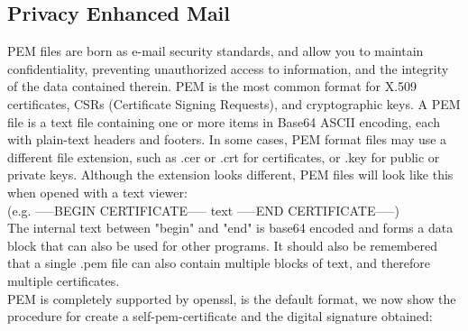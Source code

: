\documentclass{article}
\begin{document}
\subsection{Privacy Enhanced Mail}
PEM files are born as e-mail security standards, and allow you to maintain confidentiality, preventing unauthorized access to information, and the integrity of the data contained therein. PEM is the most common format for X.509 certificates, CSRs (Certificate Signing Requests), and cryptographic keys. A PEM file is a text file containing one or more items in Base64 ASCII encoding, each with plain-text headers and footers. In some cases, PEM format files may use a different file extension, such as .cer or .crt for certificates, or .key for public or private keys. Although the extension looks different, PEM files will look like this when opened with a text viewer:\\
(e.g. -----BEGIN CERTIFICATE----- text -----END CERTIFICATE-----)\\The internal text between "begin" and "end" is base64 encoded and forms a data block that can also be used for other programs. It should also be remembered that a single .pem file can also contain multiple blocks of text, and therefore multiple certificates.\\
PEM is completely supported by openssl, is the default format, we now show the procedure for create a self-pem-certificate and the digital signature obtained:
\end{document}
